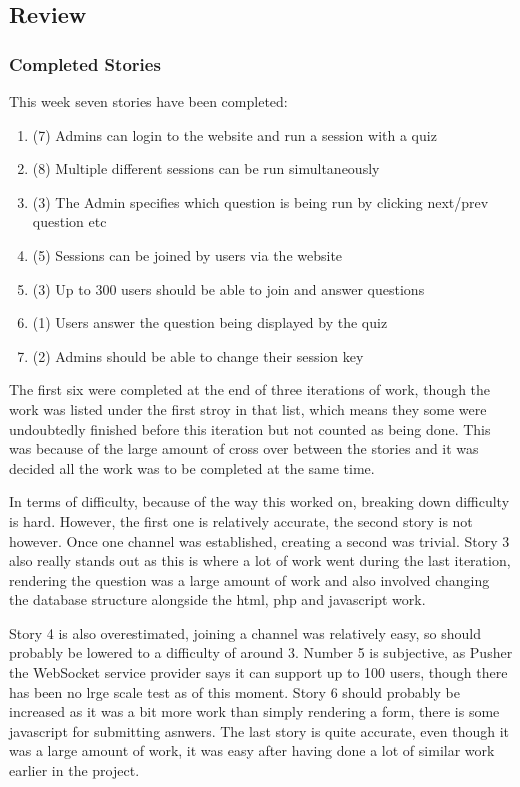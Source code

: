 \subsection{Review}
\subsubsection{Completed Stories}
This week seven stories have been completed:
\begin{enumerate}
	\item (7) Admins can login to the website and run a session with a quiz
	\item (8) Multiple different sessions can be run simultaneously
	\item (3) The Admin specifies which question is being run by clicking next/prev question etc
	\item (5) Sessions can be joined by users via the website
	\item (3) Up to 300 users should be able to join and answer questions
	\item (1) Users answer the question being displayed by the quiz
	\item (2) Admins should be able to change their session key
\end{enumerate}
The first six were completed at the end of three iterations of work, though the work was listed under the first stroy in that list, which means they some were undoubtedly finished before this iteration but not counted as being done. This was because of the large amount of cross over between the stories and it was decided all the work was to be completed at the same time.

In terms of difficulty, because of the way this worked on, breaking down difficulty is hard. However, the first one is relatively accurate, the second story  is not however. Once one channel was established, creating a second was trivial. Story 3 also really stands out as this is where a lot of work went during the last iteration, rendering the question was a large amount of work and also involved changing the database structure alongside the html, php and javascript work. 

Story 4 is also overestimated, joining a channel was relatively easy, so should probably be lowered to a difficulty of around 3. Number 5 is subjective, as Pusher the WebSocket service provider says it can support up to 100 users, though there has been no lrge scale test as of this moment. Story 6 should probably be increased as it was a bit more work than simply rendering a form, there is some javascript for submitting asnwers. The last story is quite accurate, even though it was a large amount of work, it was easy after having done a lot of similar work earlier in the project.
